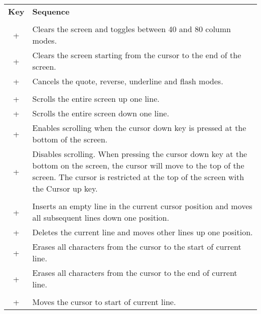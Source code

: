 \begin{center}
\begin{longtable}{c|L{5.5cm}}
	\textbf{Key} & \textbf{Sequence}\\
  \hhline{==}
	\endhead

   \\
  \hhline{==}
 +  &
Clears the screen and toggles between 40 and 80 column modes.\\
\hline
{} +  &
Clears the screen starting from the cursor to the end of the screen.\\
\hline
{} +  &
Cancels the quote, reverse, underline and flash modes.\\
  \hhline{==}
   \\
  \hhline{==}
\hline
{} +  &
Scrolls the entire screen up one line.\\
\hline
{} +  &
Scrolls the entire screen down one line.\\
\hline
{} +  &
Enables scrolling when the cursor down key is pressed at the bottom of the screen.\\
\hline
{} +  &
Disables scrolling. When pressing the cursor down key at the bottom on the screen, the cursor will move to the top of the screen. The cursor is restricted at the top of the screen with the Cursor up key.\\
  \hhline{==}
   \\
  \hhline{==}
 +  &
Inserts an empty line in the current cursor position and moves all subsequent lines down one position.\\
\hline
{} +  &
Deletes the current line and moves other lines up one position.\\
\hline
{} +  &
Erases all characters from the cursor to the start of current line.\\
\hline
{} +  &
Erases all characters from the cursor to the end of current line.\\
  \hhline{==}
   \\
  \hhline{==}
 +  &
Moves the cursor to start of current line.\\
\hline

\end{longtable}
\end{center}
